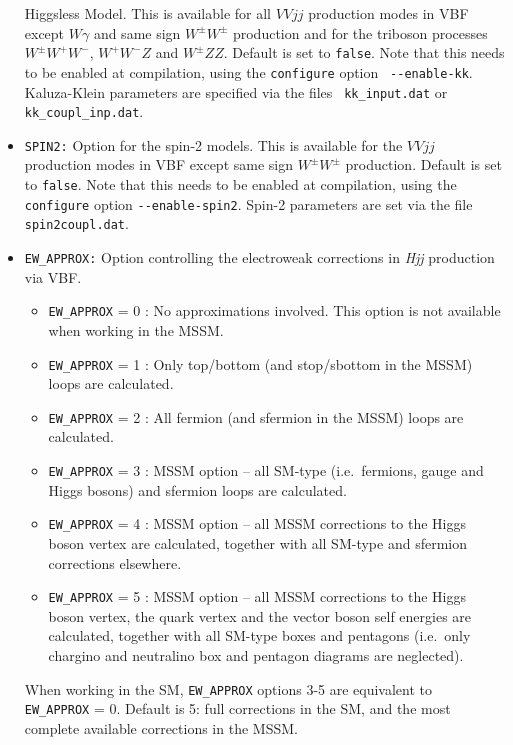 \documentclass[english,12pt]{article}
\begin{document}
\begin{itemize}
Higgsless Model. This is available for all $VVjj$ production modes in VBF except $W\gamma$ and
same sign $W^\pm W^\pm$ production and for the triboson processes $W^\pm W^+W^-$,
$W^+W^-Z$ and $W^\pm ZZ$. Default is set to {\tt false}.  Note that this needs
to be enabled at compilation, using the {\tt configure} option {\tt
-{}-enable-kk}.  Kaluza-Klein parameters are specified via the files {\tt
kk\_input.dat} or {\tt kk\_coupl\_inp.dat}.
\item {\tt SPIN2:} Option for the spin-2 models.  This is available for the
$VVjj$ production modes in VBF except same sign $W^\pm W^\pm$ production.  Default is set
to {\tt false}.  Note that this needs to be enabled at compilation, using the
{\tt configure} option {\tt -{}-enable-spin2}.  Spin-2 parameters are set via
the file {\tt spin2coupl.dat}.
\item {\tt EW\_APPROX:} Option controlling the electroweak corrections in
\textit{Hjj} production via VBF.
  \begin{itemize}
   \item {\tt EW\_APPROX} = 0 : No approximations involved.  This option is not
available when working in the MSSM.
   \item {\tt EW\_APPROX} = 1 : Only top/bottom (and stop/sbottom in the MSSM) loops
are calculated. 
   \item {\tt EW\_APPROX} = 2 : All fermion (and sfermion in the MSSM) loops are
calculated.
   \item {\tt EW\_APPROX} = 3 : MSSM option -- all SM-type (i.e.\ fermions,
gauge and Higgs bosons) and sfermion loops are calculated.
   \item {\tt EW\_APPROX} = 4 : MSSM option -- all MSSM corrections to the Higgs boson
vertex are calculated, together with all SM-type and sfermion corrections
elsewhere.
   \item {\tt EW\_APPROX} = 5 : MSSM option -- all MSSM corrections to the Higgs boson
vertex, the quark vertex and the vector boson self energies are calculated,
together with all SM-type boxes and pentagons (i.e.\ only chargino and
neutralino box and pentagon diagrams are neglected).
  \end{itemize}
  When working in the SM, {\tt EW\_APPROX} options 3-5 are equivalent to {\tt
EW\_APPROX} = 0.  Default is 5: full corrections in the SM, and the most
complete available corrections in the MSSM.
\end{itemize}


\end{document}
